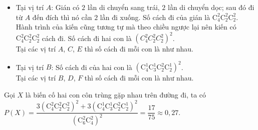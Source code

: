 \begin{ex}
{{}
\begin{itemize}
    \item Tại vị trí $A$: Gián có $2$ lần di chuyển sang trái, $2$ lần di chuyển dọc; sau đó đi từ $A$ đến đích thì nó cần $2$ lần đi xuống. Số cách đi của gián là $\mathrm{C}_4^2\mathrm{C}_2^2\mathrm{C}_2^2$.  Hành trình của kiến cũng tương tự mà theo chiều ngược lại nên kiến có $\mathrm{C}_4^2\mathrm{C}_2^2\mathrm{C}_2^2$ cách đi. Số cách đi hai con là $\left(C_4^2C_2^2C_2^2\right)^2$.\\
    Tại các vị trí $A$, $C$, $E$ thì số cách đi mỗi con là như nhau. 
    \item Tại vị trí $B$: Số cách đi của hai con là  $\left(\mathrm{C}_4^1\mathrm{C}_3^1\mathrm{C}_2^2\mathrm{C}_2^1\right)^2$.\\
    Tại các vị trí $B$, $D$, $F$ thì số cách đi mỗi con là như nhau. 
\end{itemize}
Gọi $X$ là biến cố hai con côn trùng gặp nhau trên đường đi, ta có\\ $P(X)=\dfrac{3\left(\mathrm{C}_4^2\mathrm{C}_2^2\mathrm{C}_2^2\right)^2+3\left(\mathrm{C}_4^1\mathrm{C}_3^1\mathrm{C}_2^2\mathrm{C}_2^1\right)^2}{\left(\mathrm{C}_6^2\mathrm{C}_4^2\right)^2}=\dfrac{17}{75}\approx0{,}27$.
}
\end{ex}

